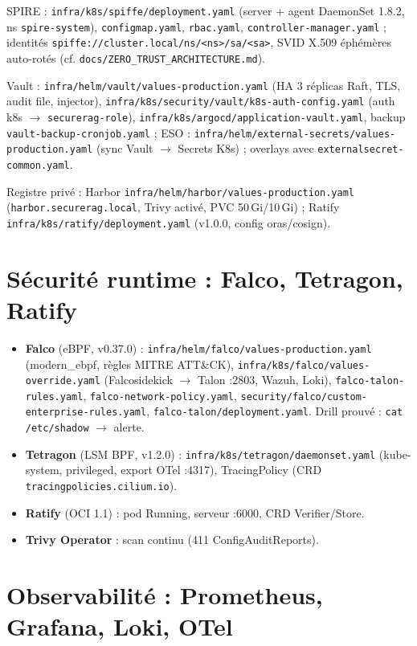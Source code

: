 \documentclass[12pt,a4paper,openany]{report}
\begin{document}
SPIRE : \texttt{infra/k8s/spiffe/deployment.yaml} (server + agent DaemonSet 1.8.2,
ns \texttt{spire-system}), \texttt{configmap.yaml}, \texttt{rbac.yaml},
\texttt{controller-manager.yaml} ; identités \texttt{spiffe://cluster.local/ns/<ns>/sa/<sa>},
SVID X.509 éphémères auto-rotés (cf. \texttt{docs/ZERO\_TRUST\_ARCHITECTURE.md}).

Vault : \texttt{infra/helm/vault/values-production.yaml} (HA 3 réplicas Raft, TLS, audit file,
injector), \texttt{infra/k8s/security/vault/k8s-auth-config.yaml}
(auth k8s $\rightarrow$ \texttt{securerag-role}),
\texttt{infra/k8s/argocd/application-vault.yaml}, backup \texttt{vault-backup-cronjob.yaml} ;
ESO : \texttt{infra/helm/external-secrets/values-production.yaml}
(sync Vault $\rightarrow$ Secrets K8s) ; overlays avec \texttt{externalsecret-common.yaml}.

Registre privé : Harbor \texttt{infra/helm/harbor/values-production.yaml}
(\texttt{harbor.securerag.local}, Trivy activé, PVC 50\,Gi/10\,Gi) ;
Ratify \texttt{infra/k8s/ratify/deployment.yaml} (v1.0.0, config oras/cosign).

\section{Sécurité runtime : Falco, Tetragon, Ratify}

\begin{itemize}
  \item \textbf{Falco} (eBPF, v0.37.0) : \texttt{infra/helm/falco/values-production.yaml}
  (modern\_ebpf, règles MITRE ATT\&CK), \texttt{infra/k8s/falco/values-override.yaml}
  (Falcosidekick $\rightarrow$ Talon :2803, Wazuh, Loki),
  \texttt{falco-talon-rules.yaml}, \texttt{falco-network-policy.yaml},
  \texttt{security/falco/custom-enterprise-rules.yaml},
  \texttt{falco-talon/deployment.yaml}. Drill prouvé : \texttt{cat /etc/shadow} $\rightarrow$ alerte.
  \item \textbf{Tetragon} (LSM BPF, v1.2.0) : \texttt{infra/k8s/tetragon/daemonset.yaml}
  (kube-system, privileged, export OTel :4317), TracingPolicy (CRD \texttt{tracingpolicies.cilium.io}).
  \item \textbf{Ratify} (OCI 1.1) : pod Running, serveur :6000, CRD Verifier/Store.
  \item \textbf{Trivy Operator} : scan continu (411 ConfigAuditReports).
\end{itemize}

\section{Observabilité : Prometheus, Grafana, Loki, OTel}
\end{document}
